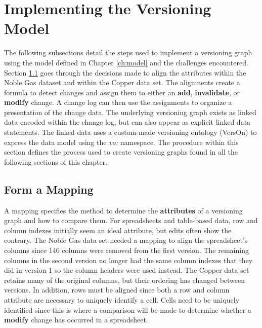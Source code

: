 \section{Implementing the Versioning Model}

The following subsections detail the steps used to implement a versioning graph using the model defined in Chapter \ref{ch:model} and the challenges encountered.
Section \ref{mapping} goes through the decisions made to align the attributes within the Noble Gas dataset and within the Copper data set.
The alignments create a formula to detect changes and assign them to either an \textbf{add}, \textbf{invalidate}, or \textbf{modify} change.
A change log can then use the assignments to organize a presentation of the change data.
The underlying versioning graph exists as linked data encoded within the change log, but can also appear as explicit linked data statements.
The linked data uses a custom-made versioning ontology (VersOn) to express the data model using the \textit{vo:} namespace.
The procedure within this section defines the process used to create versioning graphs found in all the following sections of this chapter.

\subsection{Form a Mapping} \label{mapping}

A mapping specifies the method to determine the \textbf{attributes} of a versioning graph and how to compare them.
For spreadsheets and table-based data, row and column indexes initially seem an ideal attribute, but edits often show the contrary.
The Noble Gas data set needed a mapping to align the spreadsheet's columns since 140 columns were removed from the first version.
The remaining columns in the second version no longer had the same column indexes that they did in version 1 so the column headers were used instead.
The Copper data set retains many of the original columns, but their ordering has changed between versions.
In addition, rows must be aligned since both a row and column attribute are necessary to uniquely identify a cell.
Cells need to be uniquely identified since this is where a comparison will be made to determine whether a \textbf{modify} change has occurred in a spreadsheet.

